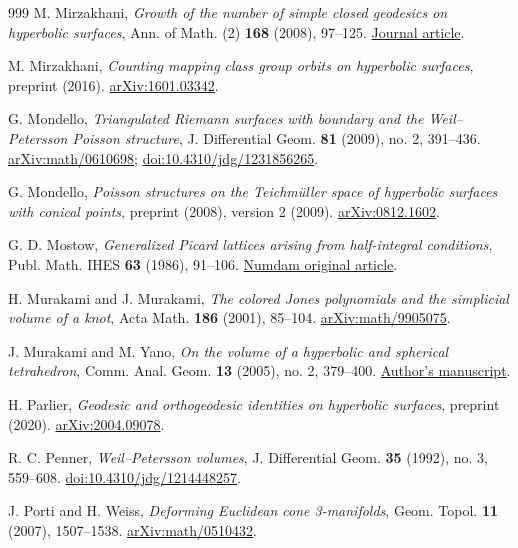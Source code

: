 \documentclass[11pt,a4paper]{article}
\numberwithin{equation}{section}
\theoremstyle{definition}
\theoremstyle{remark}
\begin{document}
\begin{thebibliography}{999}
M. Mirzakhani,
\emph{Growth of the number of simple closed geodesics on hyperbolic surfaces},
Ann. of Math. (2) \textbf{168} (2008), 97--125.
\href{https://annals.math.princeton.edu/2008/168-1/p03}{Journal article}.

M. Mirzakhani,
\emph{Counting mapping class group orbits on hyperbolic surfaces},
preprint (2016).
\href{https://arxiv.org/abs/1601.03342}{arXiv:1601.03342}.

G. Mondello,
\emph{Triangulated Riemann surfaces with boundary and the Weil--Petersson
Poisson structure}, J. Differential Geom. \textbf{81} (2009), no. 2, 391--436.
\href{https://arxiv.org/abs/math/0610698}{arXiv:math/0610698};
\href{https://doi.org/10.4310/jdg/1231856265}{doi:10.4310/jdg/1231856265}.

G. Mondello,
\emph{Poisson structures on the Teichm\"uller space of hyperbolic
surfaces with conical points}, preprint (2008), version 2 (2009).
\href{https://arxiv.org/abs/0812.1602}{arXiv:0812.1602}.

G. D. Mostow,
\emph{Generalized Picard lattices arising from half-integral conditions},
Publ. Math. IHES \textbf{63} (1986), 91--106.
\href{https://www.numdam.org/item/PMIHES_1986__63__91_0/}{Numdam original article}.

H. Murakami and J. Murakami,
\emph{The colored Jones polynomials and the simplicial volume of a knot},
Acta Math. \textbf{186} (2001), 85--104.
\href{https://arxiv.org/abs/math/9905075}{arXiv:math/9905075}.

J. Murakami and M. Yano,
\emph{On the volume of a hyperbolic and spherical tetrahedron},
Comm. Anal. Geom. \textbf{13} (2005), no. 2, 379--400.
\href{https://murakami.w.waseda.jp/papers/tetrahedronrev3.pdf}{Author's manuscript}.

H. Parlier,
\emph{Geodesic and orthogeodesic identities on hyperbolic surfaces},
preprint (2020).
\href{https://arxiv.org/abs/2004.09078}{arXiv:2004.09078}.

R. C. Penner,
\emph{Weil--Petersson volumes},
J. Differential Geom. \textbf{35} (1992), no. 3, 559--608.
\href{https://doi.org/10.4310/jdg/1214448257}{doi:10.4310/jdg/1214448257}.

J. Porti and H. Weiss,
\emph{Deforming Euclidean cone 3-manifolds},
Geom. Topol. \textbf{11} (2007), 1507--1538.
\href{https://arxiv.org/abs/math/0510432}{arXiv:math/0510432}.


\end{thebibliography}
\end{document}
